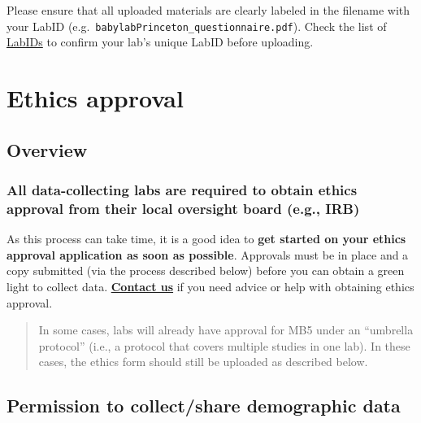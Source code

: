 \documentclass[
  letterpaper,
  DIV=11,
  numbers=noendperiod,
  oneside]{scrreprt}
\begin{document}
Please ensure that all uploaded materials are clearly labeled in the
filename with your LabID
(e.g.~\texttt{babylabPrinceton\_questionnaire.pdf}). Check the list of
\href{https://manybabies.org/labids/}{LabIDs} to confirm your lab's
unique LabID before uploading.

\chapter{Ethics approval}\label{sec-ethics}

\section{Overview}\label{overview}

\subsection[All data-collecting labs are required to obtain ethics
approval from their local oversight board (e.g.,
IRB)]{\texorpdfstring{All data-collecting labs are required to obtain
ethics approval from their local oversight board (e.g.,
IRB)}{All data-collecting labs are required to obtain ethics approval from their local oversight board (e.g., IRB)}}\label{all-data-collecting-labs-are-required-to-obtain-ethics-approval-from-their-local-oversight-board-e.g.-irb}

As this process can take time, it is a good idea to \textbf{get started
on your ethics approval application as soon as possible}. Approvals must
be in place and a copy submitted (via the process described below)
before you can obtain a green light to collect data.
\href{mailto:mb5@manybabies.org}{\textbf{Contact us}} if you need advice
or help with obtaining ethics approval.

\begin{quote}
In some cases, labs will already have approval for MB5 under an
``umbrella protocol'' (i.e., a protocol that covers multiple studies in
one lab). In these cases, the ethics form should still be uploaded as
described below.
\end{quote}

\section{Permission to collect/share demographic
data}\label{permission-to-collectshare-demographic-data}
\end{document}
